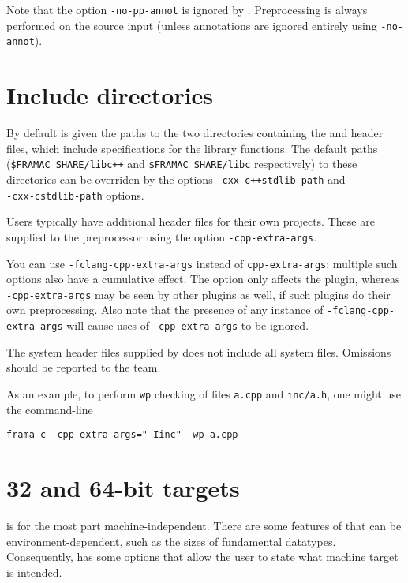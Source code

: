 Note that the \framac option \verb|-no-pp-annot| is ignored by \fclang. Preprocessing is always performed on the source input (unless annotations are ignored entirely using \verb|-no-annot|).
\section{Include directories}\label{sec:include-directories}

By default \irg is given the paths to the two directories containing the \fcl and \fc header files, which include \acslpp specifications for the \cpp library functions. The default paths (\verb|$FRAMAC_SHARE/libc++| and
\verb|$FRAMAC_SHARE/libc| respectively) to these directories
can be overriden by the \fcl options \lstinline|-cxx-c++stdlib-path| and\\
 \lstinline|-cxx-cstdlib-path| options.

Users typically have additional header files for their own projects. These are supplied to the \fcl preprocessor using the option \lstinline|-cpp-extra-args|.

You can use \lstinline|-fclang-cpp-extra-args| instead of \lstinline|cpp-extra-args|; multiple such options also have a cumulative effect. 
The \fcl option only affects the \fcl plugin, whereas 
\lstinline|-cpp-extra-args| may be seen by other plugins as well, if such plugins do their own preprocessing. Also note that the presence of any instance of \lstinline|-fclang-cpp-extra-args| will cause uses of \lstinline|-cpp-extra-args| to be ignored. 

The system header files supplied by \fcl does not include all \cpp system files. Omissions should be reported to the \fc team.

As an example, to perform \lstinline|wp| checking of files \lstinline|a.cpp| and \lstinline|inc/a.h|, one might use the command-line \\
\centerline{\texttt{frama-c -cpp-extra-args="-Iinc" -wp a.cpp}}

\section{32 and 64-bit targets}
\label{sec:bit}

\acslpp is for the most part machine-independent. 
There are some features of \cpp that can be environment-dependent, such as the sizes of fundamental datatypes. 
Consequently, \framac has some options that allow the user to state what machine target is intended. 

